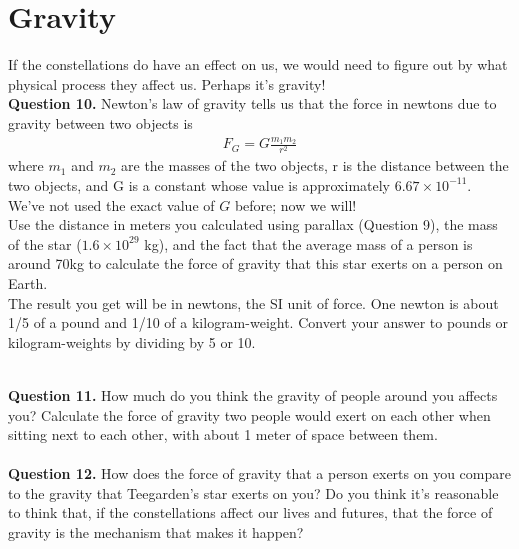 \documentclass[11pt]{article}
\begin{document}
\section{Gravity}
If the constellations do have an effect on us, we would need to figure out by what physical process they affect us. Perhaps it's gravity!\\

\textbf{Question 10.} Newton's law of gravity tells us that the force in newtons due to gravity between two objects is
\begin{align*}
F_G=G\frac{m_1 m_2}{r^2}
\end{align*}
where $m_1$ and $m_2$ are the masses of the two objects, r is the distance between the two objects, and G is a constant whose value is approximately $6.67\times 10^{-11}$. We've not used the exact value of $G$ before; now we will!\\

Use the distance in meters you calculated using parallax (Question 9), the mass of the star ($1.6\times 10^{29}$ kg), and the fact that the average mass of a person is around 70kg to calculate the force of gravity that this star exerts on a person on Earth.\\

The result you get will be in newtons, the SI unit of force. One newton is about 1/5 of a pound and 1/10 of a kilogram-weight. Convert your answer to pounds or kilogram-weights by dividing by 5 or 10.

\vspace{1.5cm}
\hrulefill\\

\textbf{Question 11.} How much do you think the gravity of people around you affects you? Calculate the force of gravity two people would exert on each other when sitting next to each other, with about 1 meter of space between them. \\

\vspace{1.5cm}
\hrulefill\\

\textbf{Question 12.} How does the force of gravity that a person exerts on you compare to the gravity that Teegarden's star exerts on you? Do you think it's reasonable to think that, if the constellations affect our lives and futures, that the force of gravity is the mechanism that makes it happen? \\

\vspace{1.5cm}
\hrulefill\\
\end{document}
